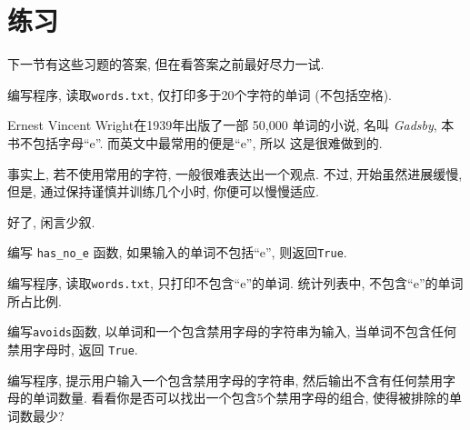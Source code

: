 \documentclass[10pt]{book}
\begin{document}
\section{练习}
下一节有这些习题的答案, 但在看答案之前最好尽力一试. 

\begin{exercise}
编写程序, 读取{\tt words.txt}, 仅打印多于20个字符的单词
(不包括空格). 

\end{exercise}

\begin{exercise}
Ernest Vincent Wright在1939年出版了一部 50,000 单词的小说, 名叫
{\em Gadsby}, 本书不包括字母``e''. 而英文中最常用的便是``e'', 所以
这是很难做到的. 

事实上, 若不使用常用的字符, 一般很难表达出一个观点. 
不过, 开始虽然进展缓慢, 但是, 通过保持谨慎并训练几个小时, 
你便可以慢慢适应. 

%
好了, 闲言少叙. 

编写 \verb"has_no_e" 函数, 如果输入的单词不包括``e'',  则返回{\tt True}. 

编写程序, 读取{\tt words.txt}, 只打印不包含``e''的单词. 
统计列表中, 不包含``e''的单词所占比例. 

\end{exercise}

\begin{exercise} 

编写{\tt avoids}函数, 以单词和一个包含禁用字母的字符串为输入, 
当单词不包含任何禁用字母时, 返回 {\tt True}. 

编写程序, 提示用户输入一个包含禁用字母的字符串, 
然后输出不含有任何禁用字母的单词数量. 
看看你是否可以找出一个包含5个禁用字母的组合, 
使得被排除的单词数最少?

\end{exercise}
\end{document}
